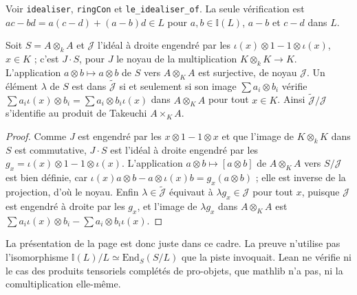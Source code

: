 \begingroup\raggedright
\noindent Voir \texttt{idealiser}, \texttt{ringCon} et \texttt{le\_idealiser\_of}. La seule vérification est $ac - bd = a(c - d) + (a - b)d \in L$ pour $a, b \in \mathbb I(L)$, $a - b$ et $c - d$ dans $L$.\par\endgroup

\begin{encadre}
\begin{theoreme}
Soit $S = A \otimes_k A$ et $\mathcal J$ l'idéal à droite engendré par les $\iota(x) \otimes 1 - 1 \otimes \iota(x)$, $x \in K$ ; c'est $J \cdot S$, pour $J$ le noyau de la multiplication $K \otimes_k K \to K$. L'application $a \otimes b \mapsto a \otimes b$ de $S$ vers $A \otimes_K A$ est surjective, de noyau $\mathcal J$. Un élément $\lambda$ de $S$ est dans $\tilde{\mathcal J}$ si et seulement si son image $\sum a_i \otimes b_i$ vérifie $\sum a_i\iota(x) \otimes b_i = \sum a_i \otimes b_i\iota(x)$ dans $A \otimes_K A$ pour tout $x \in K$. Ainsi $\tilde{\mathcal J}/\mathcal J$ s'identifie au produit de Takeuchi $A \times_K A$.
\end{theoreme}
\end{encadre}

\begin{proof}
Comme $J$ est engendré par les $x \otimes 1 - 1 \otimes x$ et que l'image de $K \otimes_k K$ dans $S$ est commutative, $J \cdot S$ est l'idéal à droite engendré par les $g_x = \iota(x) \otimes 1 - 1 \otimes \iota(x)$. L'application $a \otimes b \mapsto [a \otimes b]$ de $A \otimes_K A$ vers $S/\mathcal J$ est bien définie, car $\iota(x)a \otimes b - a \otimes \iota(x)b = g_x(a \otimes b)$ ; elle est inverse de la projection, d'où le noyau. Enfin $\lambda \in \tilde{\mathcal J}$ équivaut à $\lambda g_x \in \mathcal J$ pour tout $x$, puisque $\mathcal J$ est engendré à droite par les $g_x$, et l'image de $\lambda g_x$ dans $A \otimes_K A$ est $\sum a_i\iota(x) \otimes b_i - \sum a_i \otimes b_i\iota(x)$.
\end{proof}

\noindent La présentation de la page est donc juste dans ce cadre. La preuve n'utilise pas l'isomorphisme $\mathbb I(L)/L \simeq \mathrm{End}_S(S/L)$ que la piste invoquait. Lean ne vérifie ni le cas des produits tensoriels complétés de pro-objets, que mathlib n'a pas, ni la comultiplication elle-même.
